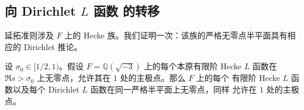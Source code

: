 \subsection{向 Dirichlet \texorpdfstring{$L$ 函数}{L-functions} 的转移}

延拓准则涉及 $F$ 上的 Hecke 族。我们证明一次：该族的严格无零点半平面具有相应的 Dirichlet 推论。

\begin{proposition}[二次转移]
\label{prop:hecke-dirichlet-transfer}
设 $\sigma_0\in[1/2,1)$。假设 $F=\mathbb Q(\sqrt{-3})$ 上的每个本原有限阶 Hecke
$L$ 函数在 $\Re s>\sigma_0$ 上无零点，允许其在 $1$ 处的主极点。那么 $F$ 上的每个
有限阶 Hecke $L$ 函数以及每个 Dirichlet $L$ 函数在同一严格半平面上无零点，同样
允许在 $1$ 处的主极点。
\end{proposition}

